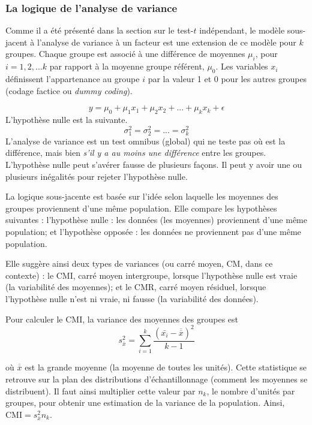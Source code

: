 \documentclass[
]{book}
\begin{document}
\hypertarget{la-logique-de-lanalyse-de-variance}{%
\subsubsection{La logique de l'analyse de variance}\label{la-logique-de-lanalyse-de-variance}}

Comme il a été présenté dans la section sur le test-\(t\) indépendant, le modèle sous-jacent à l'analyse de variance à un facteur est une extension de ce modèle pour \(k\) groupes. Chaque groupe est associé à une différence de moyennes \(\mu_i\), pour \(i = 1,2, ...k\) par rapport à la moyenne groupe référent, \(\mu_0\). Les variables \(x_i\) définissent l'appartenance au groupe \(i\) par la valeur 1 et 0 pour les autres groupes (codage factice ou \emph{dummy coding}).

\[y = \mu_0 + \mu_1x_1 + \mu_2x_2+ ... +\mu_kx_k + \epsilon\]
L'hypothèse nulle est la suivante.
\[\sigma^2_1=\sigma^2_2=...=\sigma^2_k\]
L'analyse de variance est un test omnibus (global) qui ne teste pas où est la différence, mais bien \emph{s'il y a au moins une différence} entre les groupes. L'hypothèse nulle peut s'avérer fausse de plusieurs façons. Il peut y avoir une ou plusieurs inégalités pour rejeter l'hypothèse nulle.

La logique sous-jacente est basée sur l'idée selon laquelle les moyennes des groupes proviennent d'une même population. Elle compare les hypothèses suivantes : l'hypothèse nulle : les données (les moyennes) proviennent d'une même population; et l'hypothèse opposée : les données ne proviennent pas d'une même population.

Elle suggère ainsi deux types de variances (ou carré moyen, CM, dans ce contexte) : le CMI, carré moyen intergroupe, lorsque l'hypothèse nulle est vraie (la variabilité des moyennes); et le CMR, carré moyen résiduel, lorsque l'hypothèse nulle n'est ni vraie, ni fausse (la variabilité des données).

Pour calculer le CMI, la variance des moyennes des groupes est
\[s^2_{\bar{x}}=\sum_{i=1}^k\frac{(\bar{x_i}-\overline{\overline{x}})^2}{k-1}\]

où \(\overline{\overline{x}}\) est la grande moyenne (la moyenne de toutes les unités). Cette statistique se retrouve sur la plan des distributions d'échantillonnage (comment les moyennes se distribuent). Il faut ainsi multiplier cette valeur par \(n_k\), le nombre d'unités par groupes, pour obtenir une estimation de la variance de la population. Ainsi, \(\text{CMI} = s^2_{\bar{x}}n_k\).
\end{document}
